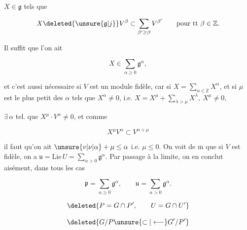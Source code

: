 
$X\in\mathfrak g$ tels que

\[
X\deleted{\unsure{\mathfrak g|j}}V^\beta\subset\sum_{\beta'\geq\beta}V^{\beta'}\qquad\text{pour tt }\beta\in\mathbb Z.
\]

Il suffit que l'on ait

\[
X\in\sum_{\alpha\geq0}\mathfrak g^\alpha,
\]

et c'est aussi nécessaire si $V$ est un module fidèle, car si $X=\sum_{\alpha\in\mathbb Z}X^\alpha$, et si \deleted{$\unsure{\lambda|\alpha}$} $\mu$ est le plus petit des $\alpha$ tels que $X^\alpha\ne0$, i.e. $X=X^\mu+\sum_{\lambda>\mu}X^\lambda,\ X^\mu\ne0$,

 $\exists\,\alpha$ tel. que $X^\mu\cdot V^\alpha\ne0$,  et comme

\[
X^\mu V^\alpha\subset V^{\alpha+\mu}
\]

il faut qu'on ait $\unsure{v|\nu|\alpha}+\mu\leq\alpha$ i.e. $\mu\leq0$. On voit de $\overline{\mathrm m}$ que si $V$ est fidèle, on a $\mathfrak u=\mathrm{Lie}\,U=\sum_{\alpha>0}\mathfrak g^\alpha$. Par passage à la limite, on en conclut aisément, dans tous les cas

\[
\mathfrak p=\sum_{\alpha\geq0}\mathfrak g^\alpha,\qquad \mathfrak u=\sum_{\alpha>0}\mathfrak g^\alpha.
\]



\[
\deleted{P=G\cap P',\qquad U=G\cap U'}
\]


\[
\deleted{G/P\unsure{\subset|\longleftarrow}G'/P'}
\]
